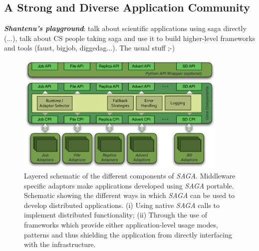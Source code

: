 \documentclass[a4paper,10pt]{article}
\newcommand{\BI}[1]{\textbf{\textit{#1}}}
\newcommand{\sagaimpl}{\textit{SAGA}\xspace}
\newcommand{\impl}{\sagaimpl}
\begin{document}
\subsection*{A Strong and Diverse Application Community}
\BI{Shantenu's playground}: talk about scientific applications using saga directly (...), talk about CS people taking saga and use it to build higher-level frameworks and tools (faust, bigjob, diggedag...). The usual stuff ;-)
 
 \pagebreak
 

\begin{figure}[hb]
  \centering
  \includegraphics[width=4in]{./figures/saga-architecture}
 \vspace{-1em}	
  \caption{\footnotesize Layered schematic of the different
    components of \impl.  Middleware specific adaptors make
    applications developed using \impl portable.  Schematic showing
    the different ways in which \impl can be used to develop
    distributed applications. (i) Using native \impl calls to
    implement distributed functionality; (ii) Through the use of
    frameworks which provide either application-level usage modes,
    patterns and thus shielding the application from directly
    interfacing with the infrastructure.}
  \label{fig:saga_arch}
\end{figure}

  
 
\end{document}
